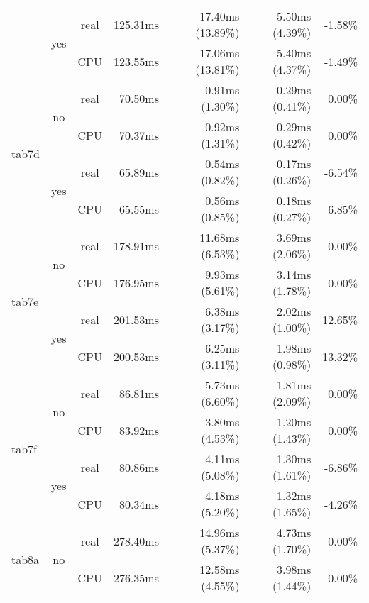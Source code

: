 \documentclass[en]{pracamgr}
\begin{document}
\begin{appendices}
\begin{small}
\begin{longtable}{|l|c|c|r|r|r|r|}
                          \cline{2-7}
                          & \multirow{2}{*}{yes} & real & 125.31ms & 17.40ms (13.89\%) & 5.50ms (4.39\%) & -1.58\% \\*
                          &                      & CPU  & 123.55ms & 17.06ms (13.81\%) & 5.40ms (4.37\%) & -1.49\% \\
\hline
\multirow{4}{*}{tab7d}    & \multirow{2}{*}{no}  & real & 70.50ms & 0.91ms (1.30\%) & 0.29ms (0.41\%) & 0.00\% \\*
                          &                      & CPU  & 70.37ms & 0.92ms (1.31\%) & 0.29ms (0.42\%) & 0.00\% \\*
                          \cline{2-7}
                          & \multirow{2}{*}{yes} & real & 65.89ms & 0.54ms (0.82\%) & 0.17ms (0.26\%) & -6.54\% \\*
                          &                      & CPU  & 65.55ms & 0.56ms (0.85\%) & 0.18ms (0.27\%) & -6.85\% \\
\hline
\multirow{4}{*}{tab7e}    & \multirow{2}{*}{no}  & real & 178.91ms & 11.68ms (6.53\%) & 3.69ms (2.06\%) & 0.00\% \\*
                          &                      & CPU  & 176.95ms & 9.93ms (5.61\%) & 3.14ms (1.78\%) & 0.00\% \\*
                          \cline{2-7}
                          & \multirow{2}{*}{yes} & real & 201.53ms & 6.38ms (3.17\%) & 2.02ms (1.00\%) & 12.65\% \\*
                          &                      & CPU  & 200.53ms & 6.25ms (3.11\%) & 1.98ms (0.98\%) & 13.32\% \\
\hline
\multirow{4}{*}{tab7f}    & \multirow{2}{*}{no}  & real & 86.81ms & 5.73ms (6.60\%) & 1.81ms (2.09\%) & 0.00\% \\*
                          &                      & CPU  & 83.92ms & 3.80ms (4.53\%) & 1.20ms (1.43\%) & 0.00\% \\*
                          \cline{2-7}
                          & \multirow{2}{*}{yes} & real & 80.86ms & 4.11ms (5.08\%) & 1.30ms (1.61\%) & -6.86\% \\*
                          &                      & CPU  & 80.34ms & 4.18ms (5.20\%) & 1.32ms (1.65\%) & -4.26\% \\
\hline
\multirow{4}{*}{tab8a}    & \multirow{2}{*}{no}  & real & 278.40ms & 14.96ms (5.37\%) & 4.73ms (1.70\%) & 0.00\% \\*
                          &                      & CPU  & 276.35ms & 12.58ms (4.55\%) & 3.98ms (1.44\%) & 0.00\% \\*

\end{longtable}
\end{small}
\end{appendices}
\end{document}
